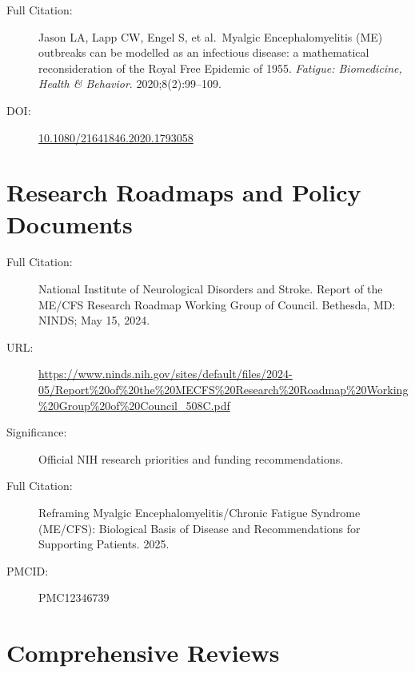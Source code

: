 \begin{description}
    \item[Full Citation:] Jason LA, Lapp CW, Engel S, et al.\ Myalgic Encephalomyelitis (ME) outbreaks can be modelled as an infectious disease: a mathematical reconsideration of the Royal Free Epidemic of 1955. \textit{Fatigue: Biomedicine, Health \& Behavior}. 2020;8(2):99--109.
    \item[DOI:] \href{https://doi.org/10.1080/21641846.2020.1793058}{10.1080/21641846.2020.1793058}
\end{description}

\section{Research Roadmaps and Policy Documents}
\label{sec:bib-policy}

\begin{description}
    \item[Full Citation:] National Institute of Neurological Disorders and Stroke. Report of the ME/CFS Research Roadmap Working Group of Council. Bethesda, MD: NINDS; May 15, 2024.
    \item[URL:] \url{https://www.ninds.nih.gov/sites/default/files/2024-05/Report\%20of\%20the\%20MECFS\%20Research\%20Roadmap\%20Working\%20Group\%20of\%20Council_508C.pdf}
    \item[Significance:] Official NIH research priorities and funding recommendations.
\end{description}

\begin{description}
    \item[Full Citation:] Reframing Myalgic Encephalomyelitis/Chronic Fatigue Syndrome (ME/CFS): Biological Basis of Disease and Recommendations for Supporting Patients. 2025.
    \item[PMCID:] PMC12346739
\end{description}

\section{Comprehensive Reviews}
\label{sec:bib-comprehensive-reviews}

